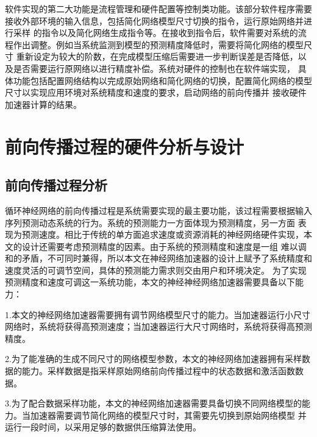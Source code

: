 软件实现的第二大功能是流程管理和硬件配置等控制类功能。该部分软件程序需要接收外部环境的输入信息，包括简化网络模型尺寸切换的指令，运行原始网络并进行采样
的指令以及简化网络生成指令等。在接收到指令后，软件需要对系统的流程作出调整。例如当系统监测到模型的预测精度降低时，需要将简化网络的模型尺寸
重新设定为较大的阶数，在完成模型压缩后需要进一步判断误差是否降低，以及是否需要运行原网络以进行精度补偿。系统对硬件的控制也在软件端实现，
具体功能包括配置网络结构以完成原始网络和简化网络的切换，配置简化网络的模型尺寸以实现应用环境对系统精度和速度的要求，启动网络的前向传播并
接收硬件加速器计算的结果。

\section{前向传播过程的硬件分析与设计}
\subsection{前向传播过程分析}
循环神经网络的前向传播过程是系统需要实现的最主要功能，该过程需要根据输入序列预测动态系统的行为。系统的预测能力一方面体现为预测精度，另一方面
表现为预测速度。相比于传统的单方面追求速度或资源消耗的神经网络硬件实现，本文的设计还需要考虑预测精度的因素。由于系统的预测精度和速度是一组
难以调和的矛盾，不可同时兼得，所以本文在神经网络加速器的设计上赋予了系统精度和速度灵活的可调节空间，具体的预测能力需求则交由用户和环境决定。
为了实现预测精度和速度可调这一系统功能，本文的神经神经网络加速器需要具备以下能力：

1.本文的神经网络加速器需要拥有调节网络模型尺寸的能力。当加速器运行小尺寸网络时，系统将获得高预测速度；当加速器运行大尺寸网络时，系统将获得高预测精度。

2.为了能准确的生成不同尺寸的网络模型参数，本文的神经网络加速器拥有采样数据的能力。采样数据是指采样原始网络前向传播过程中的状态数据和激活函数数据。

3.为了配合数据采样功能，本文的神经网络加速器需要具备切换不同网络模型的能力。当加速器需要调节简化网络的模型尺寸时，其需要先切换到原始网络模型
并运行一段时间，以采用足够的数据供压缩算法使用。 

